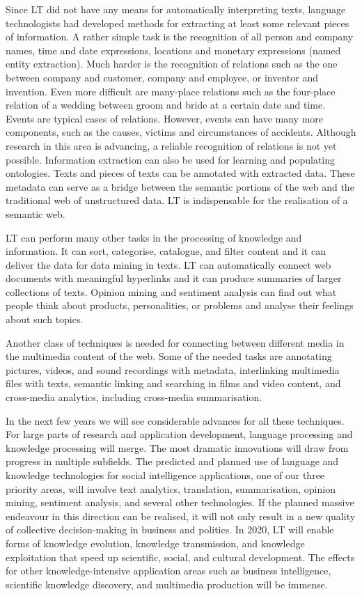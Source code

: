 \documentclass[10pt, plain]{../../metanetpaper}
\begin{document}
\begin{multicols}{2}
Since LT did not have any means for automatically interpreting texts, language technologists had developed methods for extracting at least some relevant pieces of information. A rather simple task is the recognition of all person and company names, time and date expressions, locations and monetary expressions (named entity extraction). Much harder is the recognition of relations such as the one between company and customer, company and employee, or inventor and invention. Even more difficult are many-place relations such as the four-place relation of a wedding between groom and bride at a certain date and time. Events are typical cases of relations. However, events can have many more components, such as the causes, victims and circumstances of accidents. Although research in this area is advancing, a reliable recognition of relations is not yet possible. Information extraction can also be used for learning and populating ontologies. Texts and pieces of texts can be annotated with extracted data. These metadata can serve as a bridge between the semantic portions of the web and the traditional web of unstructured data. LT is indispensable for the realisation of a semantic web.
 
LT can perform many other tasks in the processing of knowledge and information. It can sort, categorise, catalogue, and filter content and it can deliver the data for data mining in texts. LT can automatically connect web documents with meaningful hyperlinks and it can produce summaries of larger collections of texts. Opinion mining and sentiment analysis can find out what people think about products, personalities, or problems and analyse their feelings about such topics.

Another class of techniques is needed for connecting between different media in the multimedia content of the web. Some of the needed tasks are annotating pictures, videos, and sound recordings with metadata, interlinking multimedia files with texts, semantic linking and searching in films and video content, and cross-media analytics, including cross-media summarisation.
 
In the next few years we will see considerable advances for all these techniques. For large parts of research and application development, language processing and knowledge processing will merge. The most dramatic innovations will draw from progress in multiple subfields. The predicted and planned use of language and knowledge technologies for social intelligence applications, one of our three priority areas, will involve text analytics, translation, summarisation, opinion mining, sentiment analysis, and several other technologies. If the planned massive endeavour in this direction can be realised, it will not only result in a new quality of collective decision-making in business and politics. In 2020, LT will enable forms of knowledge evolution, knowledge transmission, and knowledge exploitation that speed up scientific, social, and cultural development. The effects for other knowledge-intensive application areas such as business intelligence, scientific knowledge discovery, and multimedia production will be immense.


\end{multicols}
\end{document}

